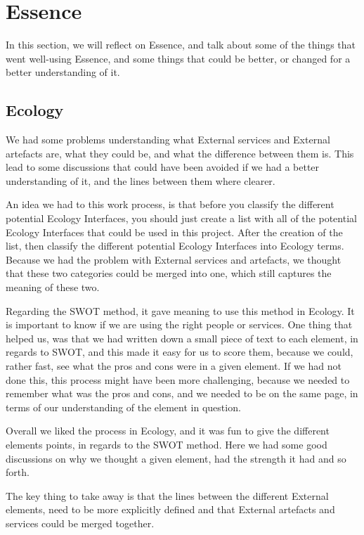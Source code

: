 \section{Essence}\label{sec:eval_essence}
In this section, we will reflect on Essence, and talk about some of the things that went well-using Essence, and some things that could be better, or changed for a better understanding of it.

\subsection{Ecology}
We had some problems understanding what External services and External artefacts are, what they could be, and what the difference between them is.
This lead to some discussions that could have been avoided if we had a better understanding of it, and the lines between them where clearer.

An idea we had to this work process, is that before you classify the different potential Ecology Interfaces, you should just create a list with all of the potential Ecology Interfaces that could be used in this project.
After the creation of the list, then classify the different potential Ecology Interfaces into Ecology terms.
Because we had the problem with External services and artefacts, we thought that these two categories could be merged into one, which still captures the meaning of these two.

Regarding the SWOT method, it gave meaning to use this method in Ecology. 
It is important to know if we are using the right people or services.
One thing that helped us, was that we had written down a small piece of text to each element, in regards to SWOT, and this made it easy for us to score them, because we could, rather fast, see what the pros and cons were in a given element.
If we had not done this, this process might have been more challenging, because we needed to remember what was the pros and cons, and we needed to be on the same page, in terms of our understanding of the element in question.

Overall we liked the process in Ecology, and it was fun to give the different elements points, in regards to the SWOT method. 
Here we had some good discussions on why we thought a given element, had the strength it had and so forth.

The key thing to take away is that the lines between the different External elements, need to be more explicitly defined and that External artefacts and services could be merged together.

